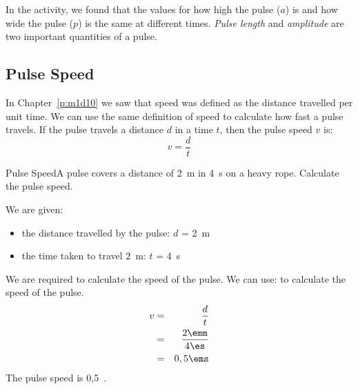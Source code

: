 In the activity, we found that the values for how high the pulse ($a$) is and how wide the pulse ($p$) is the same at different times. \textit{Pulse length} and \textit{amplitude} are two important quantities of a pulse.


\subsection{Pulse Speed}


In Chapter~\ref{p:m1d10} we saw that speed was defined as the distance travelled per unit time. We can use the same definition of speed to calculate how fast a pulse travels. If the pulse travels a distance $d$ in a time $t$, then the pulse speed $v$ is:
\begin{equation*}
v=\frac{d}{t}
\label{eq:pulsespeed}
\end{equation*}

\begin{wex}{Pulse Speed}{A pulse covers a distance of 2~m in 4~s on a heavy rope. Calculate the pulse speed.}
{
We are given:
\begin{itemize}
\item{the distance travelled by the pulse: $d$ = 2~m}
\item{the time taken to travel 2~m: $t$ = 4~s}
\end{itemize}
We are required to calculate the speed of the pulse.
We can use:
to calculate the speed of the pulse.
\begin{eqnarray*}
v&=&\frac{d}{t}\\
&=&\frac{2\emm}{4\es}\\
&=&0,5\ems
\end{eqnarray*}
The pulse speed is 0,5~\ms.
}\end{wex}


